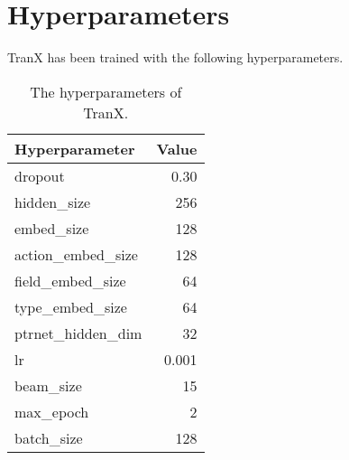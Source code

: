 \section{Hyperparameters}\label{sec:hype}

TranX has been trained with the following hyperparameters.

\begin{table}[h]
  \normalsize \centering
  \begin{tabular}{lr}
    \toprule
    Hyperparameter  & Value \\
    \midrule
    dropout             &  0.30\\
    hidden\_size        &  256 \\
    embed\_size         &  128 \\
    action\_embed\_size &  128 \\
    field\_embed\_size  &  64  \\
    type\_embed\_size   &  64  \\
    ptrnet\_hidden\_dim &  32  \\
    lr                  &  0.001\\
    beam\_size          &  15  \\
    max\_epoch          &  2  \\
    batch\_size         &  128 \\
    \bottomrule
  \end{tabular}
  \vspace{0.1cm}
  \caption{The hyperparameters of TranX.}
  \label{tab:hype}
\end{table}
